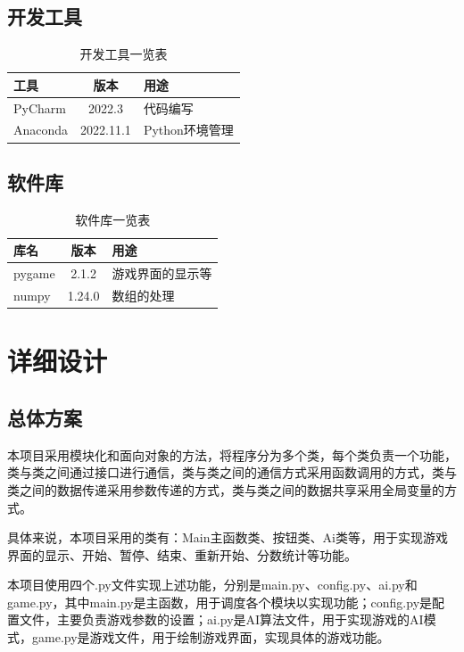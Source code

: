 \documentclass[UTF8,AutoFakeBold,AutoFakeSlant,zihao=-4]{ctexart}
\begin{document}
\subsection{开发工具}
\begin{table}[H]
  \centering
  \caption{开发工具一览表}
  \label{tab:dev-tool}
  \begin{tabular}{@{}lcl@{}}
    \toprule
    工具 & 版本 & 用途 \\ \midrule
    PyCharm & 2022.3 & 代码编写 \\ 
    Anaconda & 2022.11.1 & Python环境管理 \\ \bottomrule
  \end{tabular}
\end{table}



\subsection{软件库}
\begin{table}[H]
  \centering
  \caption{软件库一览表}
  \label{tab:soft-lib}
  \begin{tabular}{@{}lcl@{}}
    \toprule
    库名 & 版本 & 用途 \\ \midrule
    pygame & 2.1.2 & 游戏界面的显示等 \\ 
    numpy & 1.24.0 & 数组的处理 \\
    \bottomrule
  \end{tabular}
\end{table}






\clearpage

\section{详细设计}
\subsection{总体方案}
本项目采用模块化和面向对象的方法，将程序分为多个类，每个类负责一个功能，类与类之间通过接口进行通信，类与类之间的通信方式采用函数调用的方式，类与类之间的数据传递采用参数传递的方式，类与类之间的数据共享采用全局变量的方式。

具体来说，本项目采用的类有：Main主函数类、按钮类、Ai类等，用于实现游戏界面的显示、开始、暂停、结束、重新开始、分数统计等功能。

本项目使用四个.py文件实现上述功能，分别是main.py、config.py、ai.py和game.py，其中main.py是主函数，用于调度各个模块以实现功能；config.py是配置文件，主要负责游戏参数的设置；ai.py是AI算法文件，用于实现游戏的AI模式，game.py是游戏文件，用于绘制游戏界面，实现具体的游戏功能。
\end{document}
